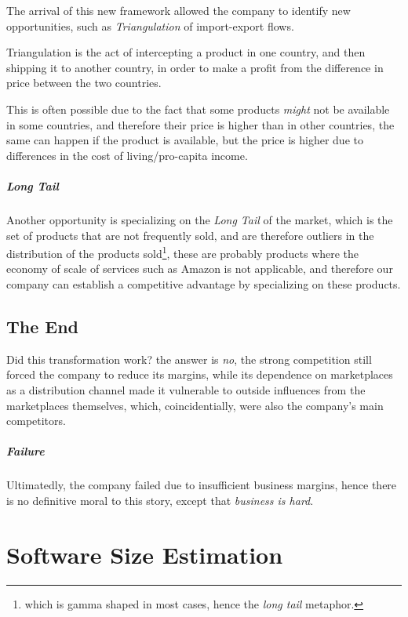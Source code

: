 \documentclass[openright, twoside, twocolumn]{report}
\begin{document}
The arrival of this new framework allowed the company to identify new opportunities, such as \emph{Triangulation} of
import-export flows.

\begin{definition}[Triangulation]
  Triangulation is the act of intercepting a product in one country, and then shipping it to another country, in order to
  make a profit from the difference in price between the two countries.

  This is often possible due to the fact that some products \emph{might} not be available in some countries, and therefore
  their price is higher than in other countries, the same can happen if the product is available, but the price is higher due to
  differences in the cost of living/pro-capita income.
\end{definition}

\paragraph{Long Tail}
Another opportunity is specializing on the \emph{Long Tail} of the market, which is the set of products that are not
frequently sold, and are therefore outliers in the distribution of the products sold\footnote{
  which is gamma shaped in most cases, hence the \emph{long tail} metaphor.
}, these are probably products where the economy of scale of services such as Amazon is not applicable, and therefore
our company can establish a competitive advantage by specializing on these products.

\section{The End}

Did this transformation work? the answer is \emph{no}, the strong competition still forced the
company to reduce its margins, while its dependence on marketplaces as a distribution channel made it vulnerable to
outside influences from the marketplaces themselves, which, coincidentially, were also the company's main competitors.

\paragraph{Failure}
Ultimatedly, the company failed due to insufficient business margins, hence there is no 
definitive moral to this story, except that \emph{business is hard}.


\chapter{Software Size Estimation}
\end{document}
